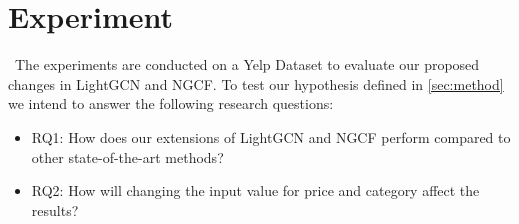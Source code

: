 \section{Experiment}\
The experiments are conducted on a Yelp Dataset to evaluate our proposed changes in LightGCN and NGCF.
To test our hypothesis defined in \autoref{sec:method} we intend to answer the following research questions:
\begin{itemize}
    \item RQ1: How does our extensions of LightGCN and NGCF perform compared to other state-of-the-art methods?
    \item RQ2: How will changing the input value for price and category affect the results?
\end{itemize}






